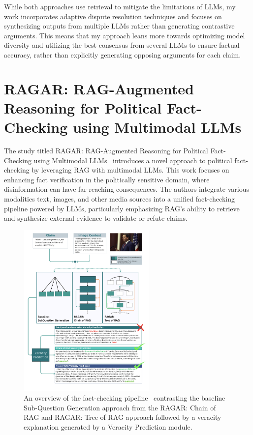 While both approaches use retrieval to mitigate the limitations of LLMs, my work incorporates adaptive dispute resolution techniques and focuses on synthesizing outputs from multiple LLMs rather than generating contrastive arguments.
This means that my approach leans more towards optimizing model diversity and utilizing the best consensus from several LLMs to ensure factual accuracy, rather than explicitly generating opposing arguments for each claim.

\section{RAGAR: RAG-Augmented Reasoning for Political Fact-Checking using Multimodal LLMs}\label{sec:agar-rag-augmented-reasoning}
The study titled RAGAR: RAG-Augmented Reasoning for Political Fact-Checking using Multimodal LLMs~\cite{khaliq2024ragarfalsehoodradarragaugmented} introduces a novel approach to political fact-checking by leveraging RAG with multimodal LLMs.
This work focuses on enhancing fact verification in the politically sensitive domain, where disinformation can have far-reaching consequences.
The authors integrate various modalities text, images, and other media sources into a unified fact-checking pipeline powered by LLMs, particularly emphasizing RAG’s ability to retrieve and synthesize external evidence to validate or refute claims.

\begin{figure}[ht!]
    \centering
    \begin{minipage}[b]{\textwidth}
        \centering
        \includegraphics[width=0.6\textwidth]{res/rel-ragar}
        \caption{An overview of the fact-checking pipeline~\cite{khaliq2024ragarfalsehoodradarragaugmented} contrasting the baseline Sub-Question Generation approach from the RAGAR: Chain of RAG and RAGAR: Tree of RAG approach followed by a veracity explanation generated by a Veracity Prediction module.}
        \label{fig:rel-ragar}
    \end{minipage}
\end{figure}

